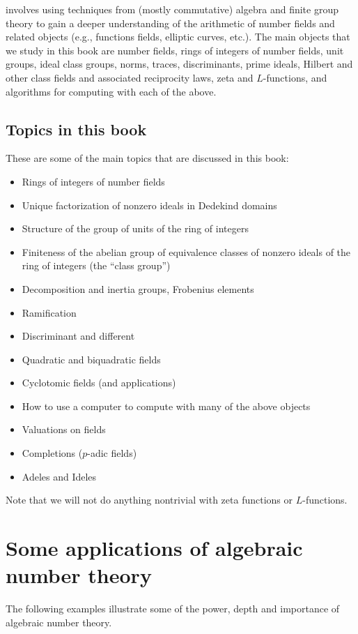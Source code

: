 involves using techniques from (mostly
commutative) algebra and finite group theory to gain a deeper
understanding of the arithmetic of number fields and related objects
(e.g., functions fields, elliptic curves, etc.).  The main objects that we
study in this book are number fields, rings of integers
of number fields, unit groups, ideal class groups, norms, traces,
discriminants, prime ideals, Hilbert and other class fields and
associated reciprocity laws, zeta and $L$-functions, and algorithms
for computing with each of the above.

\subsection{Topics in this book}
These are some of the main topics that are discussed in this book:
\begin{itemize}\setlength{\itemsep}{-.7ex}
\item Rings of integers of number fields
\item Unique factorization of nonzero ideals in Dedekind domains
\item Structure of the group of units of the ring of integers
\item Finiteness of the abelian group of equivalence classes
of nonzero ideals of the ring of integers (the ``class group'')
\item Decomposition and inertia groups, Frobenius elements
\item Ramification
\item Discriminant and different
\item Quadratic and biquadratic fields
\item Cyclotomic fields (and applications)
\item How to use a computer to compute with many of the above objects
\item Valuations on fields
\item Completions ($p$-adic fields)
\item Adeles and Ideles
\end{itemize}
Note that we will not do anything nontrivial with zeta functions or
$L$-functions. 



\section{Some applications of algebraic number theory}
The following examples illustrate some of the power, depth and
importance of algebraic number theory.

